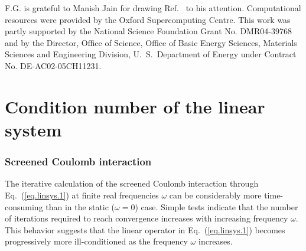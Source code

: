 \documentclass[twocolumn,prb,showpacs,superscriptaddress]{revtex4}
\def\w{\omega}
\def\r{{\bf r}}
\def\rp{{\bf r^\prime}}
\begin{document}

\begin{acknowledgments}
F.G. is grateful to Manish Jain for drawing Ref.\  to his attention.
Computational resources were provided by the Oxford Supercomputing Centre.
This work was partly supported by the National Science Foundation Grant No. DMR04-39768 and by
the Director, Office of Science, Office of Basic Energy Sciences, Materials Sciences
and Engineering Division, U.\ S.\ Department of Energy under Contract No. DE-AC02-05CH11231.
\end{acknowledgments}

\appendix

\section{Condition number of the linear system}\label{app.condition}

\subsubsection{Screened Coulomb interaction}

The iterative calculation of the screened Coulomb interaction through 
Eq.\ (\ref{eq.linsys.1}) at finite real
frequencies $\w$ can be considerably more time-consuming than in the static
($\w\!=\!0$) case. Simple tests indicate that 
the number of iterations required to reach convergence increases with 
increasing frequency $\w$. This behavior suggests that the linear operator in
Eq.\ (\ref{eq.linsys.1}) becomes progressively more ill-conditioned 
as the frequency $\w$ increases.
\end{document}
